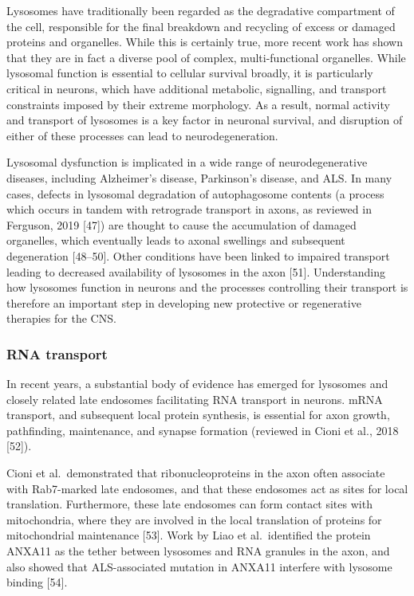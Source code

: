 \documentclass[
  12pt,
  a4paper,
]{book}
\begin{document}
Lysosomes have traditionally been regarded as the degradative compartment of the cell, responsible for the final breakdown and recycling of excess or damaged proteins and organelles. While this is certainly true, more recent work has shown that they are in fact a diverse pool of complex, multi-functional organelles. While lysosomal function is essential to cellular survival broadly, it is particularly critical in neurons, which have additional metabolic, signalling, and transport constraints imposed by their extreme morphology. As a result, normal activity and transport of lysosomes is a key factor in neuronal survival, and disruption of either of these processes can lead to neurodegeneration.

Lysosomal dysfunction is implicated in a wide range of neurodegenerative diseases, including Alzheimer's disease, Parkinson's disease, and ALS. In many cases, defects in lysosomal degradation of autophagosome contents (a process which occurs in tandem with retrograde transport in axons, as reviewed in Ferguson, 2019 {[}47{]}) are thought to cause the accumulation of damaged organelles, which eventually leads to axonal swellings and subsequent degeneration {[}48--50{]}. Other conditions have been linked to impaired transport leading to decreased availability of lysosomes in the axon {[}51{]}. Understanding how lysosomes function in neurons and the processes controlling their transport is therefore an important step in developing new protective or regenerative therapies for the CNS.

\hypertarget{rna-transport}{%
\subsubsection{RNA transport}\label{rna-transport}}

In recent years, a substantial body of evidence has emerged for lysosomes and closely related late endosomes facilitating RNA transport in neurons. mRNA transport, and subsequent local protein synthesis, is essential for axon growth, pathfinding, maintenance, and synapse formation (reviewed in Cioni et al., 2018 {[}52{]}).

Cioni et al.~demonstrated that ribonucleoproteins in the axon often associate with Rab7-marked late endosomes, and that these endosomes act as sites for local translation. Furthermore, these late endosomes can form contact sites with mitochondria, where they are involved in the local translation of proteins for mitochondrial maintenance {[}53{]}. Work by Liao et al.~identified the protein ANXA11 as the tether between lysosomes and RNA granules in the axon, and also showed that ALS-associated mutation in ANXA11 interfere with lysosome binding {[}54{]}.
\end{document}

